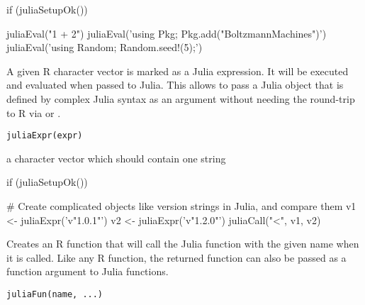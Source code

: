 %
\begin{Examples}
\begin{ExampleCode}
if (juliaSetupOk()) {

   juliaEval("1 + 2")
   juliaEval('using Pkg; Pkg.add("BoltzmannMachines")')
   juliaEval('using Random; Random.seed!(5);')

}


\end{ExampleCode}
\end{Examples}
%
\begin{Description}\relax
A given R character vector is marked as a Julia expression.
It will be executed and evaluated when passed to Julia.
This allows to pass a Julia object that is defined by complex Julia syntax
as an argument without needing the round-trip to R via 
or .
\end{Description}
%
\begin{Usage}
\begin{verbatim}
juliaExpr(expr)
\end{verbatim}
\end{Usage}
%
\begin{Arguments}
\begin{ldescription}
\item[\code{expr}] a character vector which should contain one string
\end{ldescription}
\end{Arguments}
%
\begin{Examples}
\begin{ExampleCode}
if (juliaSetupOk()) {

   # Create complicated objects like version strings in Julia, and compare them
   v1 <- juliaExpr('v"1.0.1"')
   v2 <- juliaExpr('v"1.2.0"')
   juliaCall("<", v1, v2)

}


\end{ExampleCode}
\end{Examples}
%
\begin{Description}\relax
Creates an R function that will call the Julia function with the given name
when it is called. Like any R function, the returned function can
also be passed as a function argument to Julia functions.
\end{Description}
%
\begin{Usage}
\begin{verbatim}
juliaFun(name, ...)
\end{verbatim}
\end{Usage}

